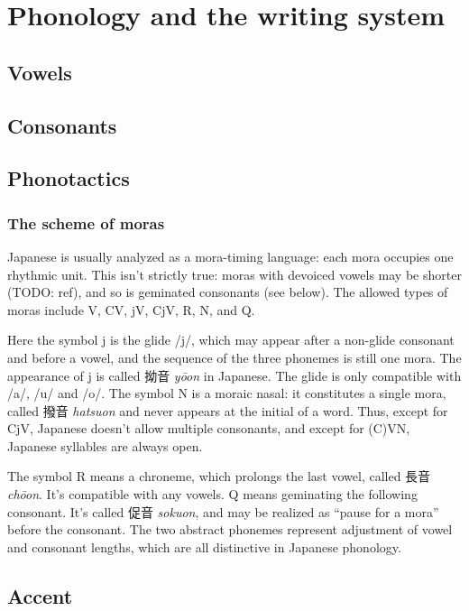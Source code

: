 \documentclass[UTF8, a4paper, oneside, scheme=plain]{ctexrep}
\newcommand{\corpus}[1]{\emph{#1}}
\begin{document}
\chapter{Phonology and the writing system}

\section{Vowels}\label{sec:vowel}

\section{Consonants}\label{sec:consonant}

\section{Phonotactics}

\subsection{The scheme of moras}\label{sec:mora-scheme}

Japanese is usually analyzed as a mora-timing language:
each mora occupies one rhythmic unit.
This isn't strictly true:
moras with devoiced vowels may be shorter (TODO: ref),
and so is geminated consonants (see below).
The allowed types of moras include V, CV, jV, CjV, R, N, and Q.

Here the symbol j is the glide /j/,
which may appear after a non-glide consonant and before a vowel,
and the sequence of the three phonemes is still one mora.
The appearance of j is called 拗音 \corpus{yōon} in Japanese.
The glide is only compatible with /a/, /u/ and /o/.
The symbol N is a moraic nasal:
it constitutes a single mora, called 撥音 \corpus{hatsuon} 
and never appears at the initial of a word.
Thus, except for CjV, Japanese doesn't allow multiple consonants,
and except for (C)VN, Japanese syllables are always open.

The symbol R means a chroneme,
which prolongs the last vowel,
called 長音 \corpus{chōon}.
It's compatible with any vowels.
Q means geminating the following consonant.
It's called 促音 \corpus{sokuon},
and may be realized as ``pause for a mora'' before the consonant. 
The two abstract phonemes represent adjustment of vowel and consonant lengths,
which are all distinctive in Japanese phonology.

\section{Accent}
\end{document}
